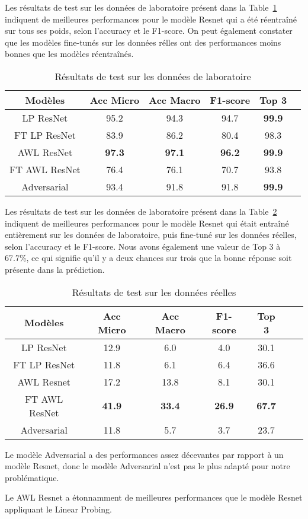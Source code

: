 Les résultats de test sur les données de laboratoire présent dans la Table~\ref{tab:results_lab} indiquent de meilleures performances pour le modèle Resnet qui a été réentraîné sur tous ses poids, selon l'accuracy et le F1-score. On peut également constater que les modèles fine-tunés sur les données rélles ont des performances moins bonnes que les modèles réentraînés.

\begin{table}[ht]
  \centering
    \begin{tabular}{cccccc}
    \toprule
    Modèles & Acc Micro & Acc Macro & F1-score & Top 3 \\
    \midrule
    LP ResNet & 95.2 & 94.3 & 94.7 & \textbf{99.9} \\
    FT LP ResNet & 83.9 & 86.2 & 80.4 & 98.3 \\
    AWL ResNet & \textbf{97.3} & \textbf{97.1} & \textbf{96.2} & \textbf{99.9} \\
    FT AWL ResNet & 76.4 & 76.1 & 70.7 & 93.8 \\
    Adversarial & 93.4 & 91.8 & 91.8 & \textbf{99.9} \\
    \bottomrule
    \end{tabular}
    \caption{Résultats de test sur les données de laboratoire}
    \label{tab:results_lab}
\end{table}

Les résultats de test sur les données de laboratoire présent dans la Table~\ref{tab: results_real} indiquent de meilleures performances pour le modèle Resnet qui était entraîné entièrement sur les données de laboratoire, puis fine-tuné sur les données réelles, selon l'accuracy et le F1-score. 
Nous avons également une valeur de Top 3 à 67.7\%, ce qui signifie qu'il y a deux chances sur trois que la bonne réponse soit présente dans la prédiction. 

\begin{table}[ht]
  \centering
    \begin{tabular}{ccccccc}
    \toprule
    Modèles & Acc Micro & Acc Macro & F1-score & Top 3 \\
    \midrule
    LP ResNet & 12.9 & 6.0 & 4.0 & 30.1 \\
    FT LP ResNet & 11.8 & 6.1 & 6.4 & 36.6 \\
    AWL Resnet & 17.2 & 13.8 & 8.1 & 30.1 \\
    FT AWL ResNet & \textbf{41.9} & \textbf{33.4} & \textbf{26.9} & \textbf{67.7} \\
    Adversarial & 11.8 & 5.7 & 3.7 & 23.7 \\
    \bottomrule
    \end{tabular}
    \caption{Résultats de test sur les données réelles}
    \label{tab: results_real}
\end{table}

Le modèle Adversarial a des performances assez décevantes par rapport à un modèle Resnet, donc le modèle Adversarial n'est pas le plus adapté pour notre problématique.

Le AWL Resnet a étonnamment de meilleures performances que le modèle Resnet appliquant le Linear Probing. 